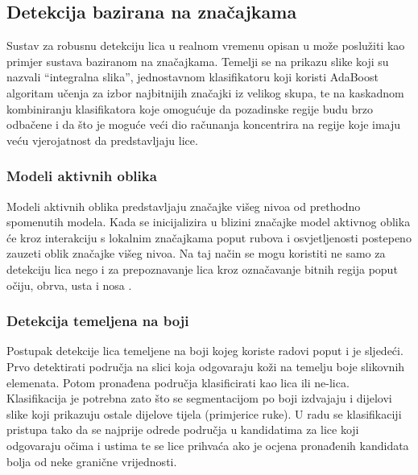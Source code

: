 \documentclass[times, utf8, seminar, numeric]{fer}
\begin{document}
\subsection{Detekcija bazirana na značajkama}

Sustav za robusnu detekciju lica u realnom vremenu opisan u \cite{Viola04robustreal-time} može poslužiti kao primjer sustava baziranom na značajkama. Temelji se na prikazu slike koji su nazvali “integralna slika”, jednostavnom klasifikatoru koji koristi AdaBoost algoritam učenja za izbor najbitnijih značajki iz velikog skupa, te na kaskadnom kombiniranju klasifikatora koje omogućuje da pozadinske regije budu brzo odbačene i da što je moguće veći dio računanja koncentrira na regije koje imaju veću vjerojatnost da predstavljaju lice.

\subsubsection{Modeli aktivnih oblika}

Modeli aktivnih oblika predstavljaju značajke višeg nivoa od prethodno spomenutih modela. Kada se inicijalizira u blizini značajke model aktivnog oblika će kroz interakciju s lokalnim značajkama poput rubova i osvjetljenosti postepeno zauzeti oblik značajke višeg nivoa. Na taj način se mogu koristiti ne samo za detekciju lica nego i za prepoznavanje lica kroz označavanje bitnih regija poput očiju, obrva, usta i nosa \cite{prabhu_utsav_facialrecog}.

\subsubsection{Detekcija temeljena na boji}

Postupak detekcije lica temeljene na boji kojeg koriste radovi poput \cite{Senior:2002:FDC:513073.513082} i \cite{conf/isda/ChandrappaR12} je sljedeći. Prvo detektirati područja na slici koja odgovaraju koži na temelju boje slikovnih elemenata. Potom pronađena područja klasificirati kao lica ili ne-lica.  Klasifikacija je potrebna zato što se segmentacijom po boji izdvajaju i dijelovi slike koji prikazuju ostale dijelove tijela (primjerice ruke). U radu \cite{Senior:2002:FDC:513073.513082} se klasifikaciji pristupa tako da se najprije odrede područja u kandidatima za lice koji odgovaraju očima i ustima te se lice prihvaća ako je ocjena pronađenih kandidata bolja od neke granične vrijednosti. 
\end{document}
